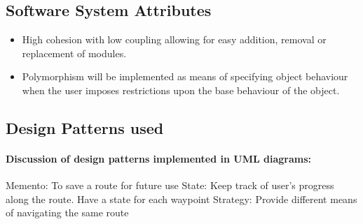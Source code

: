 \documentclass[a4paper,12pt]{article}
\begin{document}
	\subsection{Software System Attributes}
	\begin{itemize}
		\small 
		\item High cohesion with low coupling allowing for easy addition, removal or replacement of modules.
		\item Polymorphism will be implemented as means of specifying object behaviour when the user imposes restrictions
			upon the base behaviour of the object.
	\end{itemize}
	
	\subsection{Design Patterns used}
	\paragraph{Discussion of design patterns implemented in UML diagrams:}
		Memento: To save a route for future use
		State: Keep track of user's progress along the route. Have a state for each waypoint
		Strategy: Provide different means of navigating the same route
	
\end{document}
